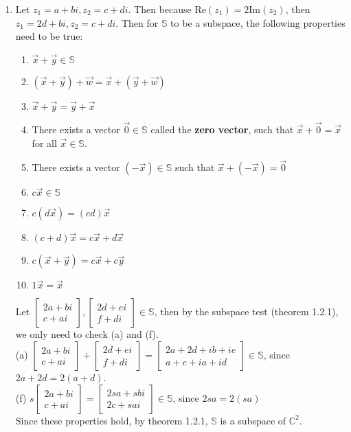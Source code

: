 \documentclass[10pt,english]{article}
\begin{document}
\begin{enumerate}
\pagebreak
\item Let $z_1=a+bi,z_2=c+di$. Then because $\text{Re}(z_1)=2\text{Im}(z_2)$, then $z_1=2d+bi, z_2=c+di$. Then for $\mathbb{S}$ to be a subspace, the following properties need to be true: \begin{enumerate}
    \item $\vec{x}+\vec{y}\in\mathbb{S}$ 
    \item $(\vec{x}+\vec{y})+\vec{w}=\vec{x}+(\vec{y}+\vec{w})$ 
    \item $\vec{x}+\vec{y}=\vec{y}+\vec{x}$ 
    \item There exists a vector $\vec{0}\in\mathbb{S}$ called the \textbf{zero vector}, such that $\vec{x}+\vec{0}=\vec{x}$ for all $\vec{x}\in\mathbb{S}$. 
    \item There exists a vector $(-\vec{x})\in\mathbb{S}$ such that $\vec{x}+(-\vec{x})=\vec{0}$ 
    \item $c\vec{x}\in\mathbb{S}$ 
    \item $c(d\vec{x})=(cd)\vec{x}$ 
    \item $(c+d)\vec{x}=c\vec{x}+d\vec{x}$ 
    \item $c(\vec{x}+\vec{y})=c\vec{x}+c\vec{y}$
    \item $1\vec{x}=\vec{x}$
\end{enumerate} 
Let $\begin{bmatrix}2a+bi\\c+ai\end{bmatrix},\begin{bmatrix}2d+ei\\f+di\end{bmatrix}\in\mathbb{S}$, then by the subspace test (theorem 1.2.1), we only need to check (a) and (f). \\
(a) $\begin{bmatrix}2a+bi\\c+ai\end{bmatrix}+\begin{bmatrix}2d+ei\\f+di\end{bmatrix}=\begin{bmatrix}2a+2d+ib+ie\\a+c+ia+id\end{bmatrix}\in\mathbb{S}$, since $2a+2d=2(a+d)$. \\
(f) $s\begin{bmatrix}2a+bi\\c+ai\end{bmatrix}=\begin{bmatrix}2sa+sbi\\2c+sai\end{bmatrix}\in\mathbb{S}$, since $2sa=2(sa)$ \\ 
Since these properties hold, by theorem 1.2.1, $\mathbb{S}$ is a subspace of $\mathbb{C}^2$. 


\end{enumerate}
\end{document}
